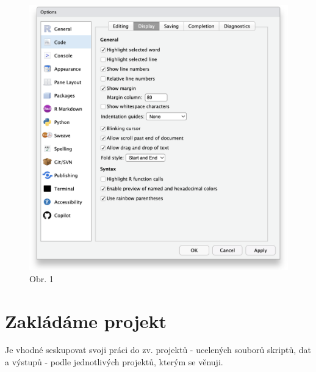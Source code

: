 \documentclass[
  letterpaper,
  DIV=11,
  numbers=noendperiod]{scrreprt}
\begin{document}
\begin{figure}

{\centering \includegraphics[width=5.3125in,height=\textheight]{images/rainbow-parentheses.png}

}

\caption{Obr. 1}

\end{figure}

\hypertarget{zakluxe1duxe1me-projekt}{%
\section{Zakládáme projekt}\label{zakluxe1duxe1me-projekt}}

Je vhodné seskupovat svoji práci do zv. projektů - ucelených souborů
skriptů, dat a výstupů - podle jednotlivých projektů, kterým se věnuji.
\end{document}
